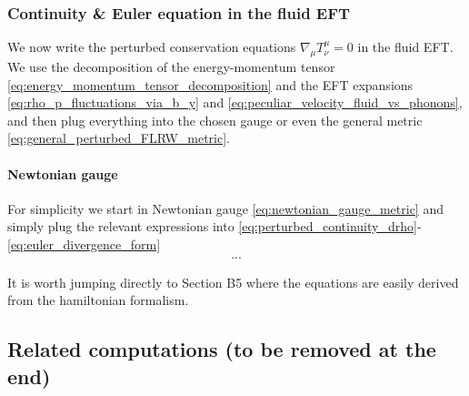 \subsubsection{Continuity \& Euler equation in the fluid EFT}
%
We now write the perturbed conservation equations $\nabla_\mu T^{\mu}_\nu=0$ in the fluid EFT.
We use the decomposition of the energy-momentum tensor \eqref{eq:energy_momentum_tensor_decomposition} and the EFT expansions \eqref{eq:rho_p_fluctuations_via_b_y} and \eqref{eq:peculiar_velocity_fluid_vs_phonons}, and then plug everything into the chosen gauge or even the general metric \eqref{eq:general_perturbed_FLRW_metric}.

\paragraph{Newtonian gauge}
For simplicity we start in Newtonian gauge \eqref{eq:newtonian_gauge_metric} and simply plug the relevant expressions into \eqref{eq:perturbed_continuity_drho}-\eqref{eq:euler_divergence_form}
\begin{align}
    ...
\end{align}

It is worth jumping directly to Section B5 where the equations are easily derived from the hamiltonian formalism.

%


%



\newpage
\subsection{Related computations (to be removed at the end)}


